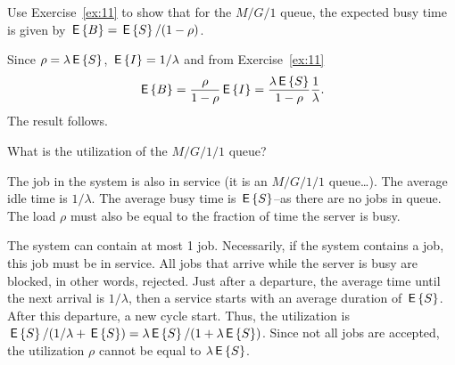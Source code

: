 \begin{exercise}
  Use Exercise~\ref{ex:11} to show that for the $M/G/1$ queue, the
  expected busy time is given by $\,\mathsf{E}\left\{B\right\} = \,\mathsf{E}\left\{S\right\}/(1-\rho)$.
  \begin{solution}
  Since $\rho = \lambda \,\mathsf{E}\left\{S\right\}$, $\,\mathsf{E}\left\{I\right\}= 1/\lambda$ and from Exercise~\ref{ex:11}
\begin{equation*}
  \,\mathsf{E}\left\{B\right\} = \frac{\rho }{1-\rho} \,\mathsf{E}\left\{I\right\} = \frac{\lambda \,\mathsf{E}\left\{S\right\}}{1-\rho} \frac1\lambda.
\end{equation*}
The result follows.
  \end{solution}
\end{exercise}

\begin{exercise}
  What is the utilization of the $M/G/1/1$ queue?  
  \begin{hint}
The job in
    the system is also in service (it is an $M/G/1/1$ queue\ldots).
    The average idle time is $1/\lambda$. The average busy time is
    $\,\mathsf{E}\left\{S\right\}$--as there are no jobs in queue. The load $\rho$ must also
    be equal to the fraction of time the server is busy. 
  \end{hint}
  \begin{solution}
 The system can contain at most 1 job. Necessarily, if the
      system contains a job, this job must be in service.  All jobs
      that arrive while the server is busy are blocked, in other
      words, rejected.  Just after a departure, the average time until
      the next arrival is $1/\lambda$, then a service starts with an
      average duration of $\,\mathsf{E}\left\{S\right\}$. After this departure, a new cycle
      start. Thus, the utilization is
      $\,\mathsf{E}\left\{S\right\}/(1/\lambda + \,\mathsf{E}\left\{S\right\}) = \lambda \,\mathsf{E}\left\{S\right\}/ (1 + \lambda \,\mathsf{E}\left\{S\right\})$.
      Since not all jobs are accepted, the utilization $\rho$ cannot
      be equal to $\lambda \,\mathsf{E}\left\{S\right\}$.
  \end{solution}
\end{exercise}

